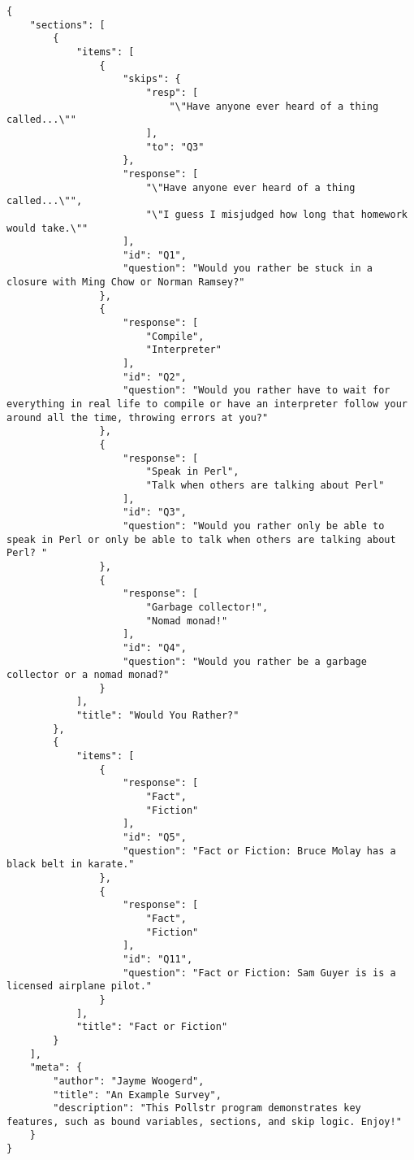 \documentclass[pldi]{sigplanconf-pldi15}
\begin{document}
\newpage
\begin{lstlisting}
{
    "sections": [
        {
            "items": [
                {
                    "skips": {
                        "resp": [
                            "\"Have anyone ever heard of a thing called...\""
                        ],
                        "to": "Q3"
                    },
                    "response": [
                        "\"Have anyone ever heard of a thing called...\"",
                        "\"I guess I misjudged how long that homework would take.\""
                    ],
                    "id": "Q1",
                    "question": "Would you rather be stuck in a closure with Ming Chow or Norman Ramsey?"
                },
                {
                    "response": [
                        "Compile",
                        "Interpreter"
                    ],
                    "id": "Q2",
                    "question": "Would you rather have to wait for everything in real life to compile or have an interpreter follow your around all the time, throwing errors at you?"
                },
                {
                    "response": [
                        "Speak in Perl",
                        "Talk when others are talking about Perl"
                    ],
                    "id": "Q3",
                    "question": "Would you rather only be able to speak in Perl or only be able to talk when others are talking about Perl? "
                },
                {
                    "response": [
                        "Garbage collector!",
                        "Nomad monad!"
                    ],
                    "id": "Q4",
                    "question": "Would you rather be a garbage collector or a nomad monad?"
                }
            ],
            "title": "Would You Rather?"
        },
        {
            "items": [
                {
                    "response": [
                        "Fact",
                        "Fiction"
                    ],
                    "id": "Q5",
                    "question": "Fact or Fiction: Bruce Molay has a black belt in karate."
                },
                {
                    "response": [
                        "Fact",
                        "Fiction"
                    ],
                    "id": "Q11",
                    "question": "Fact or Fiction: Sam Guyer is is a licensed airplane pilot."
                }
            ],
            "title": "Fact or Fiction"
        }
    ],
    "meta": {
        "author": "Jayme Woogerd",
        "title": "An Example Survey",
        "description": "This Pollstr program demonstrates key features, such as bound variables, sections, and skip logic. Enjoy!"
    }
}
\end{lstlisting}
\end{document}
